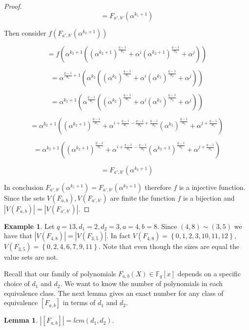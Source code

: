 \documentclass{article}
\newtheorem{lemma}[theorem]{Lemma}
\theoremstyle{definition}
\newtheorem{example}[theorem]{Example}
\theoremstyle{remark}
\numberwithin{equation}{section}
\begin{document}
\begin{proof}
  $$= F_{a', b'}(\alpha^{k_1+1})$$

  Then consider $f(F_{a', b'}(\alpha^{k_2+1}))$

  $$= f(\alpha^{k_2+1}((\alpha^{k_2+1})^{\frac{q-1}{d_1}} + \alpha^{i}(\alpha^{k_2+1})^{\frac{q-1}{d_2}} + \alpha^{j}))$$

  $$ = \alpha^{\frac{q-1}{d_1}+1}(\alpha^{k_2}((\alpha^{k_2})^{\frac{q-1}{d_1}} + \alpha^{i}(\alpha^{k_2})^{\frac{q-1}{d_2}} + \alpha^{j}))$$

  $$ = \alpha^{k_2+1}(\alpha^{\frac{q-1}{d_1}}((\alpha^{k_2})^{\frac{q-1}{d_1}} + \alpha^{i}(\alpha^{k_2})^{\frac{q-1}{d_2}} + \alpha^{j}))$$

  $$ = \alpha^{k_2+1}((\alpha^{k_2 + 1})^{\frac{q-1}{d_1}} + \alpha^{i + \frac{q-1}{d_1} - \frac{q-1}{d_2} + \frac{q-1}{d_2}}(\alpha^{k_2})^{\frac{q-1}{d_2}} + \alpha^{j + \frac{q-1}{d_1}})$$

  $$= \alpha^{k_2+1}((\alpha^{k_2 + 1})^{\frac{q-1}{d_1}} + \alpha^{i + \frac{q-1}{d_1} - \frac{q-1}{d_2}}(\alpha^{k_2 + 1})^{\frac{q-1}{d_2}} + \alpha^{j + \frac{q-1}{d_1}})$$

  $$= F_{a', b'}(\alpha^{k_2+1})$$

  In conclusion $F_{a', b'}(\alpha^{k_1+1}) = F_{a', b'}(\alpha^{k_2+1})$ therefore $f$ is a injective function. Since the sets $V(F_{a,b}), V(F_{a',b'})$ are finite the function $f$ is a bijection and $|V(F_{a,b})| = |V(F_{a',b'})|$.

\end{proof}

 \begin{example}
    Let $q = 13, d_1 = 2, d_2 = 3, a = 4, b = 8$. Since $(4,8) \sim (3,5)$ we have that $|V(F_{4, 8})| = |V(F_{3, 5})|$. In fact $V(F_{4, 8}) = \left\{0, 1, 2, 3, 10, 11, 12\right\}$, $V(F_{3, 5}) = \left\{0, 2, 4, 6, 7, 9, 11\right\}$. Note that even though the sizes are equal the value sets are not.
  \end{example}

Recall that our family of polynomials $F_{a,b}(X) \in \mathbb{F}_{q}[x]$ depends on a specific choice of $d_1$ and $d_2$. We want to know the number of polynomials in each equivalence class. The next lemma gives an exact number for any class of equivalence $[F_{a,b}]$ in terms of $d_1$ and $d_2$.

\begin{lemma}
  
  $|[F_{a, b}]| = lcm(d_1,d_2)$.

\end{lemma}
\end{document}
